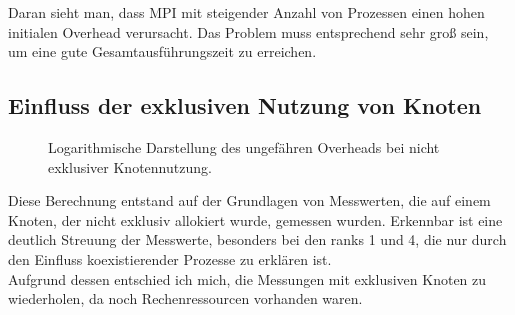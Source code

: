 \documentclass[german,plainarticle,hyperref,utf8]{zihpub}
\begin{document}
	Daran sieht man, dass MPI mit steigender Anzahl von Prozessen einen hohen initialen Overhead verursacht. Das Problem muss entsprechend sehr groß sein, um eine gute Gesamtausführungszeit zu erreichen.\\
	\clearpage
	\subsection{Einfluss der exklusiven Nutzung von Knoten}\label{exklusiv}
	\begin{figure}[h]
		\centering
		
		\caption{Logarithmische Darstellung des ungefähren Overheads bei nicht exklusiver Knotennutzung.}
	\end{figure}
	Diese Berechnung entstand auf der Grundlagen von Messwerten, die auf einem Knoten, der nicht exklusiv allokiert wurde, gemessen wurden. Erkennbar ist eine deutlich Streuung der Messwerte, besonders bei den ranks 1 und 4, die nur durch den Einfluss koexistierender Prozesse zu erklären ist.\\
	Aufgrund dessen entschied ich mich, die Messungen mit exklusiven Knoten zu wiederholen, da noch Rechenressourcen vorhanden waren. 
	\newpage
	\appendix
\end{document}

